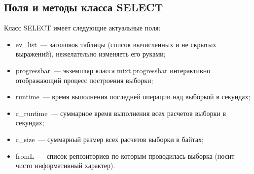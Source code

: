 \subsection{Поля и методы класса {\sf SELECT}}
Класс {\sf SELECT} имеет следующие актуальные поля:
\begin{itemize}
\item {\sf ev\_list}~--- заголовок таблицы (список вычисленных и не скрытых
  выражений), нежелательно изменяеть его руками;
\item {\sf progressbar}~--- экземпляр
класса {\sf mixt.progressbar} интерактивно отображающий процесс построения
выборки;
\item {\sf runtime}~--- время выполнения последней операции над выборкой в
  секундах;
\item {\sf c\_runtime}~--- суммарное время выполнения всех расчетов выборки в
  секундах;
\item {\sf c\_size}~--- суммарный размер всех расчетов выборки в
  байтах;
\item {\sf fromL}~--- список репозиториев по которым проводилась выборка
  (носит чисто информативный характер).
\end{itemize}

